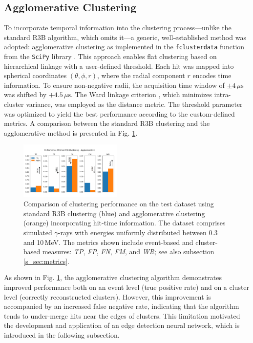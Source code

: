 \documentclass[final,5p,times,twocolumn]{elsarticle}
\begin{document}
\subsection{Agglomerative Clustering}\label{s_sec:agglo}
To incorporate temporal information into the clustering process---unlike the standard R3B algorithm, which omits it---a generic, well-established method was adopted: agglomerative clustering \cite{Nielsen2016} as implemented in the \texttt{fclusterdata} function from the \texttt{SciPy} library \cite{virtanen2020scipy}. This approach enables flat clustering based on hierarchical linkage with a user-defined threshold.\newline
Each hit was mapped into spherical coordinates \((\theta, \phi, r)\), where the radial component \(r\) encodes time information. To ensure non-negative radii, the acquisition time window of \(\pm 4\,\mu\mathrm{s}\) was shifted by \(+4.5\,\mu\mathrm{s}\). The Ward linkage criterion \cite{nielsen2016hierarchical}, which minimizes intra-cluster variance, was employed as the distance metric.\newline
The threshold parameter was optimized to yield the best performance according to the custom-defined metrics. A comparison between the standard R3B clustering and the agglomerative method is presented in Fig. \ref{fig:r3b_agglo_metrics}.
\begin{figure}[!htb]
	\centering 
	\includegraphics[width=0.45\textwidth]{r3b_agglo_arrows.png}	
	\caption{Comparison of clustering performance on the test dataset using standard R3B clustering (blue) and agglomerative clustering (orange) incorporating hit-time information. The dataset comprises simulated $\gamma$-rays with energies uniformly distributed between 0.3 and 10\,MeV. The metrics shown include event-based and cluster-based measures: \textit{TP}, \textit{FP}, \textit{FN}, \textit{FM}, and \textit{WR}; see also subsection \ref{s_sec:metrics}.} 
	\label{fig:r3b_agglo_metrics}%
\end{figure}
As shown in Fig. \ref{fig:r3b_agglo_metrics}, the agglomerative clustering algorithm demonstrates improved performance both on an event level (true positive rate) and on a cluster level (correctly reconstructed clusters). However, this improvement is accompanied by an increased false negative rate, indicating that the algorithm tends to under-merge hits near the edges of clusters. This limitation motivated the development and application of an edge detection neural network, which is introduced in the following subsection.
\end{document}
